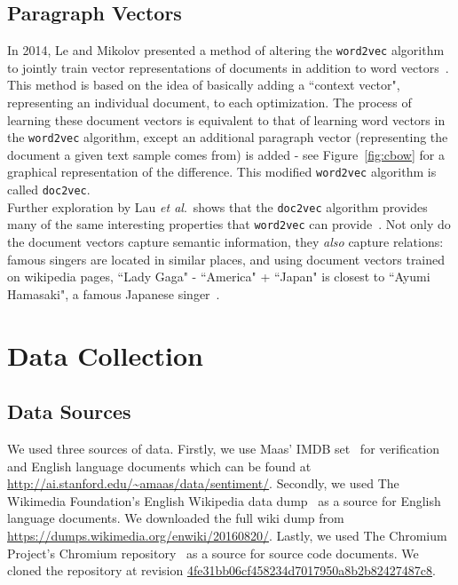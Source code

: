\documentclass[11pt]{article}
\def\etal{\emph{et al}.\ }
\begin{document}
\subsection*{Paragraph Vectors}
In 2014, Le and Mikolov presented a method of altering the \texttt{word2vec}
algorithm to jointly train vector representations of documents in addition
to word vectors~\cite{le2014distributed}. This method is based on the idea of
basically adding a ``context vector", representing an individual document, to
each optimization. The process of learning these document vectors is equivalent
to that of learning word vectors in the \texttt{word2vec} algorithm, except an
additional paragraph vector (representing the document a given text sample comes
from) is added - see Figure~\ref{fig:cbow} for a graphical representation of the
difference. This modified \texttt{word2vec} algorithm is called
\texttt{doc2vec}.\\
Further exploration by Lau \etal shows that the \texttt{doc2vec} algorithm
provides many of the same interesting properties that \texttt{word2vec} can
provide~\cite{lau2016empirical}. Not only do the document vectors capture
semantic information, they \textit{also} capture relations: famous singers
are located in similar places, and using document vectors trained on wikipedia
pages, ``Lady Gaga" - ``America" + ``Japan" is closest to ``Ayumi Hamasaki",
a famous Japanese singer~\cite{dai2015document}.

\section*{Data Collection}

\subsection*{Data Sources}
We used three sources of data. Firstly, we use Maas' IMDB set~\cite{maas2011}
for verification and English language documents which can be found at
\url{http://ai.stanford.edu/~amaas/data/sentiment/}. Secondly, we used The
Wikimedia Foundation's English Wikipedia data dump~\cite{wikidatadump2016} as
a source for English language documents. We downloaded the full wiki dump from
\url{https://dumps.wikimedia.org/enwiki/20160820/}. Lastly, we used The
Chromium Project's Chromium repository~\cite{chromium2016} as a source for
source code documents. We cloned the repository at revision
\href{https://github.com/nwjs/chromium.src/commit/4fe31bb06cf458234d7017950a8b2b82427487c8}
{4fe31bb06cf458234d7017950a8b2b82427487c8}.
\end{document}
